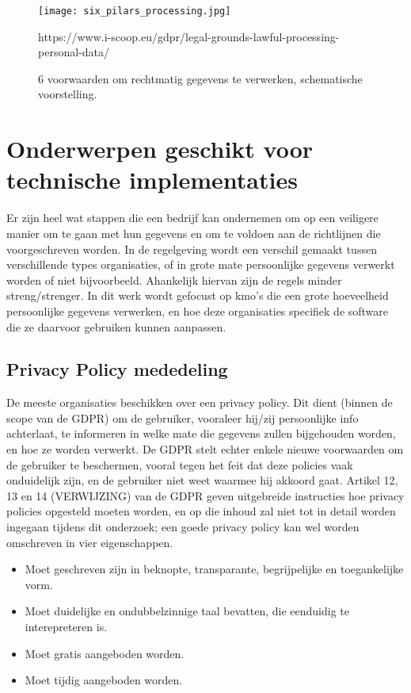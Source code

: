 \begin{figure}[h]
    \centering
    \texttt{[image: six\_pilars\_processing.jpg]}
    \caption{6 voorwaarden om rechtmatig gegevens te verwerken, schematische voorstelling.}
    https://www.i-scoop.eu/gdpr/legal-grounds-lawful-processing-personal-data/
\end{figure}


\section{Onderwerpen geschikt voor technische implementaties}

Er zijn heel wat stappen die een bedrijf kan ondernemen om op een veiligere manier om te gaan met hun gegevens en om te voldoen aan de richtlijnen die voorgeschreven worden.
In de regelgeving wordt een verschil gemaakt tussen verschillende types organisaties, of in grote mate persoonlijke gegevens verwerkt worden of niet bijvoorbeeld. Ahankelijk hiervan zijn de regels minder streng/strenger. In dit werk wordt gefocust op kmo's die een grote hoeveelheid persoonlijke gegevens verwerken, en hoe deze organisaties specifiek de software die ze daarvoor gebruiken kunnen aanpassen. 

\subsection{Privacy Policy mededeling}
De meeste organisaties beschikken over een privacy policy. Dit dient (binnen de scope van de GDPR) om de gebruiker, vooraleer hij/zij persoonlijke info achterlaat, te informeren in welke mate die gegevens zullen bijgehouden worden, en hoe ze worden verwerkt. De GDPR stelt echter enkele nieuwe voorwaarden om de gebruiker te beschermen, vooral tegen het feit dat deze policies vaak onduidelijk zijn, en de gebruiker niet weet waarmee hij akkoord gaat.
Artikel 12, 13 en 14 (VERWIJZING) van de GDPR geven uitgebreide instructies hoe privacy policies opgesteld moeten worden, en op die inhoud zal niet tot in detail worden ingegaan tijdens dit onderzoek; een goede privacy policy kan wel worden omschreven in vier eigenschappen. 

\begin{itemize}
	\item Moet geschreven zijn in beknopte, transparante, begrijpelijke en toegankelijke vorm.
	\item Moet duidelijke en ondubbelzinnige taal bevatten, die eenduidig te interepreteren is. 
	\item Moet gratis aangeboden worden.
	\item Moet tijdig aangeboden worden.
\end{itemize}

